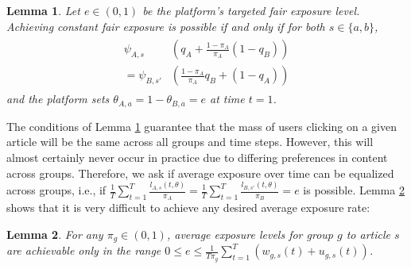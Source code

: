 \documentclass[letterpaper]{article} %
\newtheorem{lemma}{Lemma}
\begin{document}
\begin{lemma}\label{lemma:possibility_of_fair_exposure}
Let $e \in (0,1)$ be the platform's targeted fair exposure level.
Achieving constant fair exposure is possible if and only if for both $s\in\{a,b\}$,
\footnotesize
\begin{align}
    \label{eq:condition_equal_constant_exposure}
    \begin{split}
        \psi_{A,s}&\left(q_A  + \frac{1-\pi_A}{\pi_A} (1-q_B) \right) \\
    = \psi_{B,s'}&\left( \frac{1-\pi_A}{\pi_A} q_B  + (1-q_A)\right)
    \end{split}
\end{align}
\normalsize
and the platform sets $\theta_{A,a} = 1-\theta_{B,a}=e $ at time $t=1$.
\end{lemma}

The conditions of Lemma \ref{lemma:possibility_of_fair_exposure} guarantee that the mass of users clicking on a given article will be the same across all groups and time steps.
%
However, this will almost certainly never occur in practice due to differing preferences in content across groups.
%
Therefore, we ask if average exposure over time can be equalized across groups, i.e., if $\frac{1}{T}\sum_{t=1}^T\frac{l_{A,s}(t,\theta)}{\pi_A} = \frac{1}{T}\sum_{t=1}^T\frac{l_{B,s'}(t,\theta)}{\pi_B}=e$ is possible.
%
Lemma \ref{lemma:avg_exp_1group} shows that it is very difficult to achieve any desired average exposure rate:

\begin{lemma} \label{lemma:avg_exp_1group}
For any $\pi_g \in (0,1)$, average exposure levels for group $g$ to article $s$ are achievable only in the range $0 \leq e \leq \frac{1}{T \pi_g} \sum_{t=1}^T \left(w_{g,s}(t) + u_{g,s}(t) \right)$.
\end{lemma}
\end{document}
